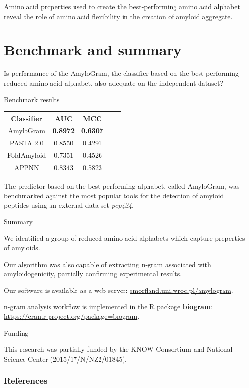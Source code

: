 \documentclass{beamer}\usepackage[]{graphicx}\usepackage[]{color}
\begin{document}
\begin{frame}
Amino acid properties used to create the best-performing amino acid alphabet reveal the role of amino acid flexibility in the creation of amyloid aggregate.
\end{frame}

\section{Benchmark and summary}

\begin{frame}
Is performance of the AmyloGram, the classifier based on the best-performing reduced amino acid alphabet, also adequate on the independent dataset?
\end{frame}


\begin{frame}{Benchmark results}

\begin{table}[ht]
\centering

\begin{tabular}{ccccc}
  \toprule
Classifier & AUC & MCC \\ 
  \midrule
AmyloGram & \textbf{0.8972} & \textbf{0.6307} \\ 
  \rowcolor{white}PASTA 2.0\citep{walsh_pasta_2014} & 0.8550 & 0.4291  \\ 
   FoldAmyloid \citep{garbuzynskiy_foldamyloid:_2010} & 0.7351 & 0.4526  \\ 
  \rowcolor{white}APPNN \citep{familia_prediction_2015} & 0.8343 & 0.5823  \\ 
   \bottomrule
\end{tabular}
\end{table}

The predictor based on the best-performing alphabet, called AmyloGram, was benchmarked against the most popular tools for the detection of amyloid peptides using an external data set \textit{pep424}.

\end{frame}

\begin{frame}{Summary}

We identified a group of reduced amino acid alphabets which capture properties of amyloids. 

Our algorithm was also capable of extracting n-gram associated with amyloidogenicity, partially confirming experimental results.

Our software is available as a web-server: \url{smorfland.uni.wroc.pl/amylogram}.

n-gram analysis workflow is implemented in the R package \textbf{biogram}: \url{https://cran.r-project.org/package=biogram}.

\end{frame}

\begin{frame}{Funding}

This research was partially funded by the KNOW Consortium and National Science Center (2015/17/N/NZ2/01845).

\end{frame}



\begin{frame}[allowframebreaks]
        \frametitle{References}
  
  
\end{frame}  
\end{document}

